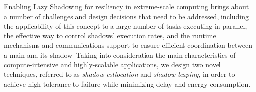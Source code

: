 Enabling Lazy Shadowing for resiliency in extreme-scale computing 
brings about a number of challenges and design decisions that need to be addressed, including the applicability of this concept to a large number of 
tasks executing in parallel, the effective way to control shadows' execution rates, and the runtime mechanisms and 
communications support to ensure efficient coordination between a 
main and its shadow.
Taking into consideration the main characteristics of compute-intensive and highly-scalable applications, we design two novel techniques, referred to as {\it shadow collocation} and {\it shadow leaping}, in order to achieve high-tolerance to failure while minimizing delay and energy consumption. %





%



